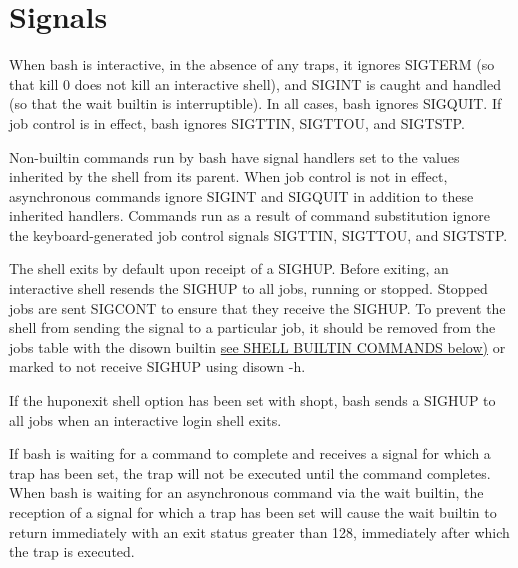 \section{Signals}\label{sec:signals}
When bash is interactive, in the absence of any traps, it ignores SIGTERM (so that kill 0 does not kill an interactive shell), and SIGINT is caught and handled (so that the wait builtin is interruptible). In all cases, bash ignores SIGQUIT. If job control is in effect, bash ignores SIGTTIN, SIGTTOU, and SIGTSTP.

Non-builtin commands run by bash have signal handlers set to the values inherited by the shell from its parent. When job control is not in effect, asynchronous commands ignore SIGINT and SIGQUIT in addition to these inherited handlers. Commands run as a result of command substitution ignore the keyboard-generated job control signals SIGTTIN, SIGTTOU, and SIGTSTP.

The shell exits by default upon receipt of a SIGHUP. Before exiting, an interactive shell resends the SIGHUP to all jobs, running or stopped. Stopped jobs are sent SIGCONT to ensure that they receive the SIGHUP. To prevent the shell from sending the signal to a particular job, it should be removed from the jobs table with the disown builtin \hyperref[sec:shellbuiltincommands]{see SHELL BUILTIN COMMANDS below)} or marked to not receive SIGHUP using disown -h.

If the huponexit shell option has been set with shopt, bash sends a SIGHUP to all jobs when an interactive login shell exits.

If bash is waiting for a command to complete and receives a signal for which a trap has been set, the trap will not be executed until the command completes. When bash is waiting for an asynchronous command via the wait builtin, the reception of a signal for which a trap has been set will cause the wait builtin to return immediately with an exit status greater than 128, immediately after which the trap is executed.